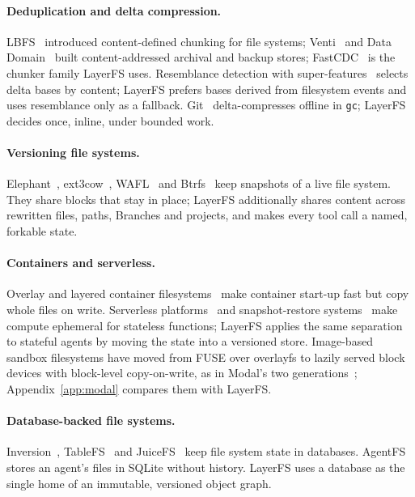 \documentclass[letterpaper,twocolumn,10pt]{article}
\newcommand{\sys}{LayerFS}
\begin{document}
\paragraph{Deduplication and delta compression.} LBFS~\cite{lbfs} introduced
content-defined chunking for file systems; Venti~\cite{venti} and Data
Domain~\cite{datadomain} built content-addressed archival and backup stores;
FastCDC~\cite{fastcdc} is the chunker family \sys{} uses. Resemblance
detection with super-features~\cite{shilane,finesse} selects delta bases by
content; \sys{} prefers bases derived from filesystem events and uses
resemblance only as a fallback. Git~\cite{git} delta-compresses offline in
\texttt{gc}; \sys{} decides once, inline, under bounded work.

\paragraph{Versioning file systems.} Elephant~\cite{elephant},
ext3cow~\cite{ext3cow}, WAFL~\cite{wafl} and Btrfs~\cite{btrfs} keep
snapshots of a live file system. They share blocks that stay in place;
\sys{} additionally shares content across rewritten files, paths, Branches
and projects, and makes every tool call a named, forkable state.

\paragraph{Containers and serverless.} Overlay and layered container
filesystems~\cite{overlayfs,slacker} make container start-up fast but copy
whole files on write. Serverless platforms~\cite{berkeleyserverless,sock}
and snapshot-restore systems~\cite{firecracker,catalyzer,reap} make compute
ephemeral for stateless functions; \sys{} applies the same separation to
stateful agents by moving the state into a versioned store. Image-based
sandbox filesystems have moved from FUSE over overlayfs to lazily served
block devices with block-level copy-on-write, as in Modal's two
generations~\cite{modalimagefs,modalvmfs}; Appendix~\ref{app:modal} compares
them with \sys{}.

\paragraph{Database-backed file systems.} Inversion~\cite{inversion},
TableFS~\cite{tablefs} and JuiceFS~\cite{juicefs} keep file system state in
databases. AgentFS~\cite{agentfs} stores an agent's files in SQLite without
history. \sys{} uses a database as the single home of an immutable,
versioned object graph.
\end{document}
